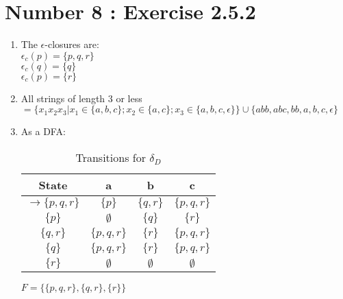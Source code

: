 \documentclass[12pt,a4paper,twoside]{article}  %
\begin{document}
\section{Number 8 : Exercise 2.5.2}
\begin{enumerate}
\item The $\epsilon$-closures are: \\
 $\epsilon_c(p) = \{p, q, r\}$ \\
 $\epsilon_c(q) = \{q\}$ \\
 $\epsilon_c(p) = \{r\}$ \\

\item All strings of length 3 or less $= \{x_1x_2x_3 | x_1 \in
  \{a,b,c\}; x_2 \in \{a,c\}; x_3 \in \{a,b,c,\epsilon\}\} \cup
  \{abb, abc, bb, a, b, c, \epsilon\}$

\item As a DFA:
\begin{table}
\begin{tabular}{c || c | c | c}
State                        &a              &b            &c \\
\hline\hline
$\rightarrow \{p, q, r\}$    & $\{p\}$       & $\{q, r\}$  & $\{p, q, r\}$ \\
$\{p\}$                      & $\emptyset$   & $\{q\}$     & $\{r\}$       \\
$\{q, r\}$                   & $\{p, q, r\}$ & $\{r\}$     & $\{p, q, r\}$ \\
$\{q\}$                      & $\{p, q, r\}$ & $\{r\}$     & $\{p, q, r\}$ \\
$\{r\}$                      & $\emptyset$   & $\emptyset$ & $\emptyset$
\end{tabular}
\caption{Transitions for $\delta_D$}\label{2.5.2.c}
\end{table}

$F = \{\{p, q, r\}, \{q, r\}, \{r\}\}$


\end{enumerate}
\end{document}
